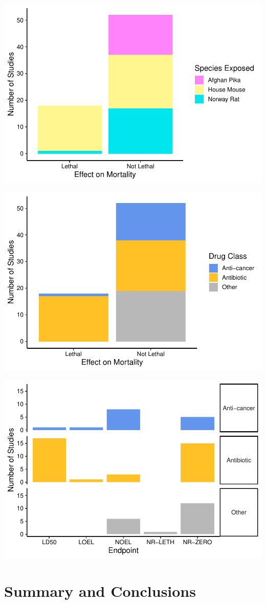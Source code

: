 \documentclass[12pt,]{article}
\begin{document}
\includegraphics{Untitled_files/figure-latex/Visualization3-1.pdf}

\includegraphics{Untitled_files/figure-latex/visualization4-1.pdf}

\includegraphics{Untitled_files/figure-latex/visualization5-1.pdf}

\newpage

\section{Summary and Conclusions}\label{summary-and-conclusions}
\end{document}
